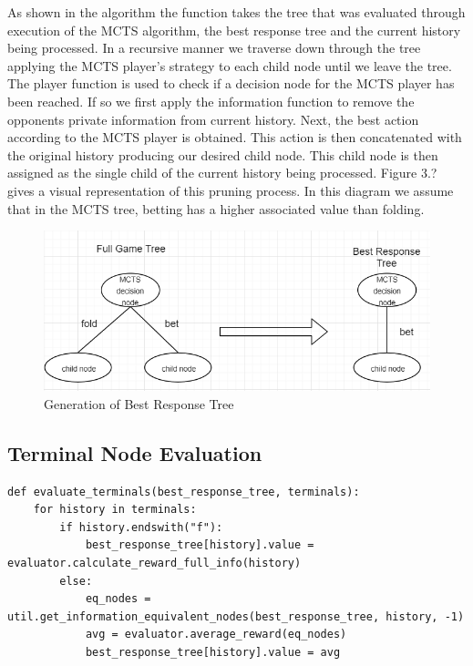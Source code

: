 As shown in the algorithm the function takes the tree that was evaluated
through execution of the MCTS algorithm, the best response tree and the current history being processed.
In a recursive manner we traverse down through the tree applying the MCTS player's
strategy to each child node until we leave the tree.
The player function is used to check if a decision node for the MCTS player has been reached.
If so we first apply the information function to remove the opponents private information from current history.
Next, the best action according to the MCTS player is obtained.
This action is then concatenated with the original history producing our desired child node.
This child node is then assigned as the single child of the current history being processed.
Figure 3.? gives a visual representation of this pruning process.
In this diagram we assume that in the MCTS tree, betting has a higher associated value than folding.

\begin{figure}[!ht]
    \includegraphics[scale=1]{images/best_response_tree_vs_full_tree.PNG}
    \caption{Generation of Best Response Tree}
\end{figure}

\subsection{Terminal Node Evaluation}\label{subsec:terminalNodeEvaluation}

\begin{lstlisting}[style=Python]
def evaluate_terminals(best_response_tree, terminals):
    for history in terminals:
        if history.endswith("f"):
            best_response_tree[history].value = evaluator.calculate_reward_full_info(history)
        else:
            eq_nodes = util.get_information_equivalent_nodes(best_response_tree, history, -1)
            avg = evaluator.average_reward(eq_nodes)
            best_response_tree[history].value = avg
\end{lstlisting}

